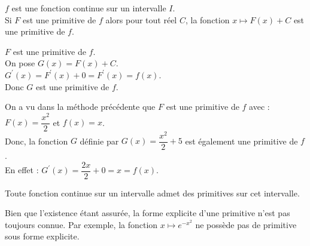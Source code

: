 \begin{bprop}
	$f$ est une fonction continue sur un intervalle $I$.\\
	Si $F$ est une primitive de $f$ alors pour tout réel $C$, la fonction $x \longmapsto F(x)+C$ est une primitive de $f$.
\end{bprop}


\begin{bdemo}
	$F$ est une primitive de $f$.\\
	On pose $G(x)=F(x)+C$.\\
	$G^{\prime}(x)=F^{\prime}(x)+0=F^{\prime}(x)=f(x)$.\\
	Donc $G$ est une primitive de $f$.
\end{bdemo}

\begin{bexemple}
	On a vu dans la méthode précédente que $F$ est une primitive de $f$ avec :\\
	$F(x)=\dfrac{x^{2}}{2}$ et $f(x)=x$.\\
	Donc, la fonction $G$ définie par $G(x)=\dfrac{x^{2}}{2}+5$ est également une primitive de $f$.\\
	En effet : $G^{\prime}(x)=\dfrac{2 x}{2}+0=x=f(x)$.
\end{bexemple}

\begin{bprop}
	Toute fonction continue sur un intervalle admet des primitives sur cet intervalle.
\end{bprop}

\begin{brmq}
	Bien que l'existence étant assurée, la forme explicite d'une primitive n'est pas toujours connue. Par exemple, la fonction $x \mapsto e^{-x^{2}}$ ne possède pas de primitive sous forme explicite.
\end{brmq}

